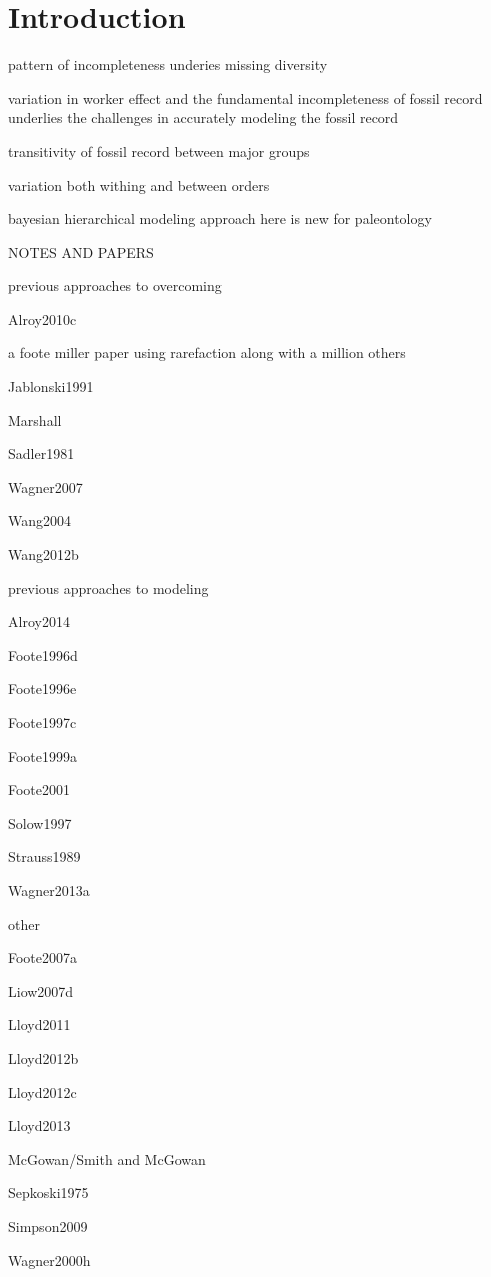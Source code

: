 \documentclass[12pt,letterpaper]{article}
\begin{document}
\section{Introduction}

pattern of incompleteness underies missing diversity

variation in worker effect and the fundamental incompleteness of fossil record underlies the challenges in accurately modeling the fossil record

transitivity of fossil record between major groups

variation both withing and between orders

bayesian hierarchical modeling approach here is new for paleontology



\uppercase{notes and papers}

previous approaches to overcoming

Alroy2010c %

a foote miller paper using rarefaction along with a million others

Jablonski1991 %

Marshall %

Sadler1981

Wagner2007

Wang2004

Wang2012b


previous approaches to modeling

Alroy2014

Foote1996d

Foote1996e

Foote1997c

Foote1999a

Foote2001

Solow1997

Strauss1989

Wagner2013a


other

Foote2007a

Liow2007d

Lloyd2011

Lloyd2012b

Lloyd2012c

Lloyd2013

McGowan/Smith and McGowan

Sepkoski1975

Simpson2009

Wagner2000h
\end{document}
